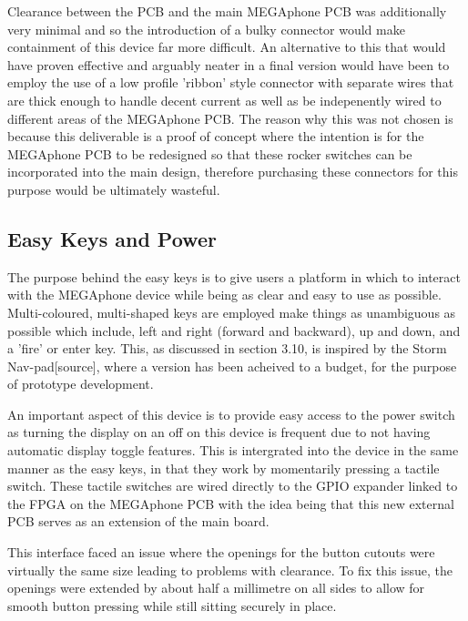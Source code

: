 Clearance between the PCB and the main MEGAphone PCB was additionally very minimal and so the introduction of a bulky connector would make containment of this device far more difficult.
An alternative to this that would have proven effective and arguably neater in a final version would have been to employ the use of a low profile 'ribbon' style connector with separate wires that are thick enough to handle decent current as well as be indepenently wired to different areas of the MEGAphone PCB.
The reason why this was not chosen is because this deliverable is a proof of concept where the intention is for the MEGAphone PCB to be redesigned so that these rocker switches can be incorporated into the main design, therefore purchasing these connectors for this purpose would be ultimately wasteful.

\subsection{Easy Keys and Power}

The purpose behind the easy keys is to give users a platform in which to interact with the MEGAphone device while being as clear and easy to use as possible.
Multi-coloured, multi-shaped keys are employed make things as unambiguous as possible which include, left and right (forward and backward), up and down, and a 'fire' or enter key.
This, as discussed in section 3.10, is inspired by the Storm Nav-pad[source], where a version has been acheived to a budget, for the purpose of prototype development.

An important aspect of this device is to provide easy access to the power switch as turning the display on an off on this device is frequent due to not having automatic display toggle features.
This is intergrated into the device in the same manner as the easy keys, in that they work by momentarily pressing a tactile switch.
These tactile switches are wired directly to the GPIO expander linked to the FPGA on the MEGAphone PCB with the idea being that this new external PCB serves as an extension of the main board.

This interface faced an issue where the openings for the button cutouts were virtually the same size leading to problems with clearance. 
To fix this issue, the openings were extended by about half a millimetre on all sides to allow for smooth button pressing while still sitting securely in place.

